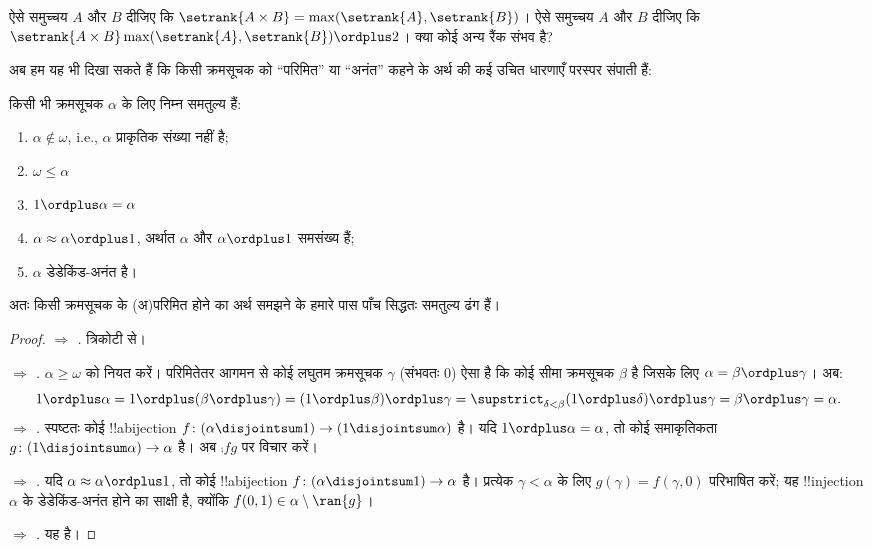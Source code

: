 \documentclass[../../../include/open-logic-section]{subfiles}
\begin{document}
\begin{prob}
ऐसे समुच्चय $A$ और $B$ दीजिए कि
$\setrank{A \times B}= \max(\setrank{A}, \setrank{B})$। ऐसे समुच्चय $A$
और $B$ दीजिए कि
$\setrank{A \times B}\max(\setrank{A}, \setrank{B}) \ordplus 2$। क्या कोई
अन्य रैंक संभव है?
\end{prob}

अब हम यह भी दिखा सकते हैं कि किसी क्रमसूचक को ``परिमित'' या ``अनंत'' कहने
के अर्थ की कई उचित धारणाएँ परस्पर संपाती हैं:

\begin{lem}
किसी भी क्रमसूचक $\alpha$ के लिए निम्न समतुल्य हैं:
\begin{enumerate}
	\item{} $\alpha\notin \omega$, i.e.,
	$\alpha$ प्राकृतिक संख्या नहीं है;
	\item{} $\omega \leq \alpha$ 
	\item{} $1 \ordplus  \alpha = \alpha$ 
	\item{} $\alpha \approx \alpha\ordplus 1$,
	अर्थात $\alpha$ और $\alpha\ordplus 1$ समसंख्य हैं;
	\item{} $\alpha$ डेडेकिंड-अनंत है।
	\end{enumerate}
\end{lem}
\noindent
अतः किसी क्रमसूचक के (अ)परिमित होने का अर्थ समझने के हमारे पास पाँच सिद्धतः
समतुल्य ढंग हैं।

\begin{proof}
\emph{ $\Rightarrow$ .}
त्रिकोटी से।

\emph{ $\Rightarrow$ .}
$\alpha \geq \omega$ को नियत करें। परिमितेतर आगमन से कोई लघुतम क्रमसूचक
$\gamma$ (संभवतः $0$) ऐसा है कि कोई सीमा क्रमसूचक $\beta$ है जिसके लिए
$\alpha = \beta \ordplus \gamma$। अब:
\[
	1 \ordplus \alpha =  
	1 \ordplus (\beta \ordplus \gamma) = 
	(1 \ordplus \beta) \ordplus \gamma =  
	\supstrict_{\delta < \beta} (1 \ordplus  \delta) \ordplus  \gamma = 
	\beta \ordplus  \gamma = 
	\alpha.
\]
\emph{ $\Rightarrow$ .} स्पष्टतः
कोई !!a{bijection}
$f \colon (\alpha \disjointsum 1) \to (1 \disjointsum \alpha)$ है। यदि
$1 \ordplus \alpha = \alpha$, तो कोई समाकृतिकता
$g \colon (1 \disjointsum \alpha) \to \alpha$ है। अब $\comp{f}{g}$ पर
विचार करें।

\emph{ $\Rightarrow$ .} यदि
$\alpha \approx \alpha \ordplus 1$, तो कोई !!a{bijection}
$f \colon (\alpha \disjointsum 1) \to \alpha$ है। प्रत्येक
$\gamma < \alpha$ के लिए $g(\gamma) = f(\gamma, 0)$ परिभाषित करें; यह
!!{injection} $\alpha$ के डेडेकिंड-अनंत होने का साक्षी है, क्योंकि
$f(0,1) \in \alpha \setminus \ran{g}$।

\emph{ $\Rightarrow$ .} यह
 है।
\end{proof}
\end{document}
